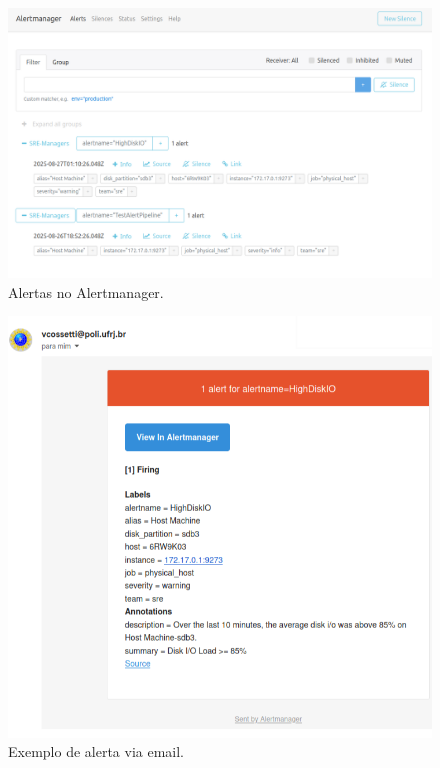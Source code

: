 \begin{figure}[H]
\centering
\setlength{\abovecaptionskip}{-20pt}
\includegraphics[width=\textwidth]{Imagens/chap04/alerts/alert_alertmanager.png}
\caption{Alertas no Alertmanager.}
\label{fig:alert_alertmanager}
\end{figure}

\begin{figure}[H]
\centering
\setlength{\abovecaptionskip}{-20pt}
\includegraphics[width=\textwidth]{Imagens/chap04/alerts/alert_email.png}
\caption{Exemplo de alerta via email.}
\label{fig:alert_email}
\end{figure}

